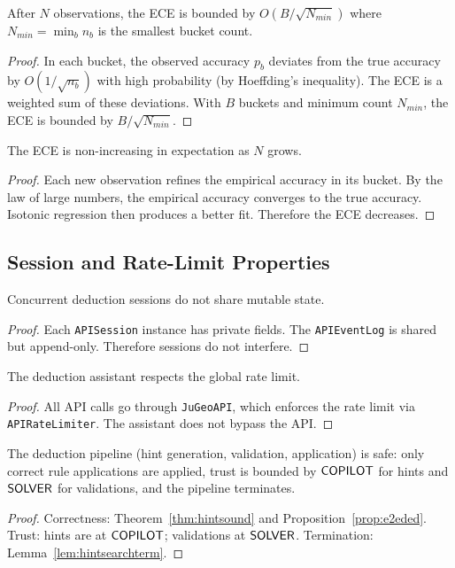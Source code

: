 \documentclass[11pt]{article}
\begin{document}
\begin{lemma}%
\label{lem:ecebound}
After $N$ observations, the ECE is bounded by
$O(B/\sqrt{N_{min}})$ where $N_{min} = \min_b n_b$
is the smallest bucket count.
\end{lemma}
\begin{proof}
In each bucket, the observed accuracy $p_b$ deviates from
the true accuracy by $O(1/\sqrt{n_b})$ with high probability
(by Hoeffding's inequality).  The ECE is a weighted sum of
these deviations.  With $B$ buckets and minimum count
$N_{min}$, the ECE is bounded by $B / \sqrt{N_{min}}$.
\end{proof}

\begin{lemma}%
\label{lem:calibimprove}
The ECE is non-increasing in expectation as $N$ grows.
\end{lemma}
\begin{proof}
Each new observation refines the empirical accuracy in its
bucket.  By the law of large numbers, the empirical accuracy
converges to the true accuracy.  Isotonic regression then
produces a better fit.  Therefore the ECE decreases.
\end{proof}

\subsection{Session and Rate-Limit Properties}

\begin{lemma}%
\label{lem:dedsessiso}
Concurrent deduction sessions do not share mutable state.
\end{lemma}
\begin{proof}
Each \texttt{APISession} instance has private fields.  The
\texttt{APIEventLog} is shared but append-only.  Therefore
sessions do not interfere.
\end{proof}

\begin{lemma}%
\label{lem:dedratelimit}
The deduction assistant respects the global rate limit.
\end{lemma}
\begin{proof}
All API calls go through \texttt{JuGeoAPI}, which enforces
the rate limit via \texttt{APIRateLimiter}.  The assistant
does not bypass the API.
\end{proof}

\begin{proposition}%
\label{prop:dedpipelinesafe}
The deduction pipeline (hint generation, validation, application)
is safe: only correct rule applications are applied, trust is
bounded by $\mathsf{COPILOT}$ for hints and $\mathsf{SOLVER}$ for validations,
and the pipeline terminates.
\end{proposition}
\begin{proof}
Correctness: Theorem~\ref{thm:hintsound} and
Proposition~\ref{prop:e2eded}.
Trust: hints are at $\mathsf{COPILOT}$; validations at $\mathsf{SOLVER}$.
Termination: Lemma~\ref{lem:hintsearchterm}.
\end{proof}
\end{document}
